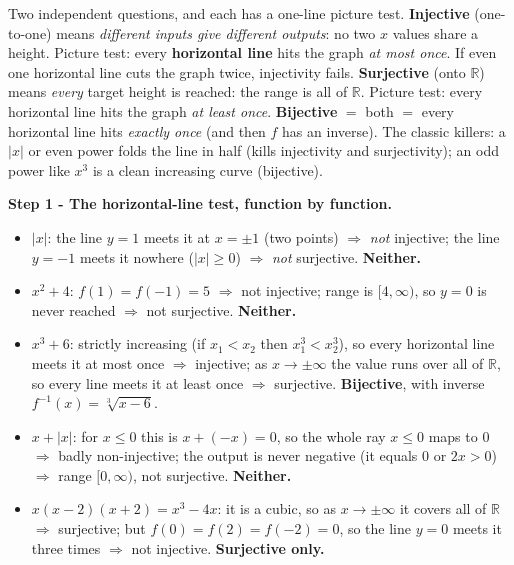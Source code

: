 \documentclass[11pt,a4paper]{article}
\newcommand{\R}{\mathbb{R}}
\begin{document}
\begin{ideabox}
Two independent questions, and each has a one-line picture test.
\textbf{Injective} (\textquotedbl{}one-to-one\textquotedbl{}) means \emph{different inputs give
different outputs}: no two $x$ values share a height. Picture test: every \textbf{horizontal line}
hits the graph \emph{at most once}. If even one horizontal line cuts the graph twice, injectivity
fails. \textbf{Surjective} (\textquotedbl{}onto $\R$\textquotedbl{}) means \emph{every} target
height is reached: the range is all of $\R$. Picture test: every horizontal line hits the graph
\emph{at least once}. \textbf{Bijective} $=$ both $=$ every horizontal line hits \emph{exactly
once} (and then $f$ has an inverse). The classic killers: a $|x|$ or even power folds the line in
half (kills injectivity and surjectivity); an odd power like $x^3$ is a clean increasing curve
(bijective).
\end{ideabox}

\textbf{Step 1 - The horizontal-line test, function by function.}
\begin{itemize}[leftmargin=1.4em,itemsep=1pt]
\item[(a)] $|x|$: the line $y=1$ meets it at $x=\pm1$ (two points) $\Rightarrow$ \emph{not}
injective; the line $y=-1$ meets it nowhere ($|x|\ge0$) $\Rightarrow$ \emph{not} surjective.
\textbf{Neither.}
\item[(b)] $x^2+4$: $f(1)=f(-1)=5$ $\Rightarrow$ not injective; range is $[4,\infty)$, so $y=0$ is
never reached $\Rightarrow$ not surjective. \textbf{Neither.}
\item[(c)] $x^3+6$: strictly increasing (if $x_1<x_2$ then $x_1^3<x_2^3$), so every horizontal
line meets it at most once $\Rightarrow$ injective; as $x\to\pm\infty$ the value runs over all of
$\R$, so every line meets it at least once $\Rightarrow$ surjective. \textbf{Bijective}, with
inverse $f^{-1}(x)=\sqrt[3]{x-6}$.
\item[(d)] $x+|x|$: for $x\le0$ this is $x+(-x)=0$, so the whole ray $x\le0$ maps to $0$
$\Rightarrow$ badly non-injective; the output is never negative (it equals $0$ or $2x>0$)
$\Rightarrow$ range $[0,\infty)$, not surjective. \textbf{Neither.}
\item[(e)] $x(x-2)(x+2)=x^3-4x$: it is a cubic, so as $x\to\pm\infty$ it covers all of $\R$
$\Rightarrow$ surjective; but $f(0)=f(2)=f(-2)=0$, so the line $y=0$ meets it three times
$\Rightarrow$ not injective. \textbf{Surjective only.}
\end{itemize}
\end{document}
